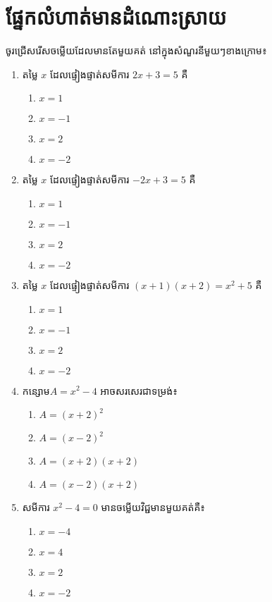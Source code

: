 \section{ផ្នែកលំហាត់មានដំណោះស្រាយ}
\begin{center}
ចូរជ្រើសរើសចម្លើយដែលមានតែមួយគត់ នៅក្នុងសំណួរនីមួយៗខាងក្រោម៖
\end{center}
\begin{enumerate}
\item តម្លៃ $x$ ដែលផ្ទៀងផ្ទាត់សមីការ $2x+3=5$ គឺ
\begin{enumerate}[k,4]
	\item $x=1$
	\item $x=-1$
	\item $x=2$
	\item $x=-2$
\end{enumerate}

\item តម្លៃ $x$ ដែលផ្ទៀងផ្ទាត់សមីការ $-2x+3=5$ គឺ
\begin{enumerate}[k,4]
	\item $x=1$
	\item $x=-1$
	\item $x=2$
	\item $x=-2$
\end{enumerate}

\item តម្លៃ $x$ ដែលផ្ទៀងផ្ទាត់សមីការ $(x+1)(x+2)=x^2+5$ គឺ
\begin{enumerate}[k,4]
	\item $x=1$
	\item $x=-1$
	\item $x=2$
	\item $x=-2$
\end{enumerate}

\item កន្សោម$A=x^2-4$ អាចសរសេរជាទម្រង់៖
\begin{enumerate}[k,4]
	\item $A=(x+2)^2$
	\item $A=(x-2)^2$
	\item $A=(x+2)(x+2)$
	\item $A=(x-2)(x+2)$
\end{enumerate}

\item សមីការ $x^2-4=0$ មានចម្លើយវិជ្ជមានមួយគត់គឺ៖
\begin{enumerate}[k,4]
	\item $x=-4$
	\item $x=4$
	\item $x=2$
	\item $x=-2$
\end{enumerate}


\end{enumerate}

